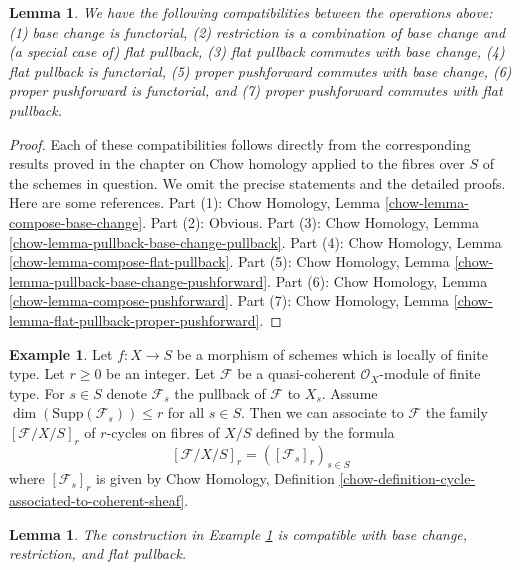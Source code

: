 \documentclass{stacks-project}
\theoremstyle{plain}
\newtheorem{lemma}[subsection]{Lemma}
\theoremstyle{definition}
\newtheorem{example}[subsection]{Example}
\theoremstyle{remark}
\numberwithin{equation}{subsection}
\begin{document}
\begin{lemma}
\label{lemma-compatibilities}
We have the following compatibilities between the operations above:
(1) base change is functorial,
(2) restriction is a combination of base change and (a special case of)
flat pullback,
(3) flat pullback commutes with base change,
(4) flat pullback is functorial,
(5) proper pushforward commutes with base change,
(6) proper pushforward is functorial, and
(7) proper pushforward commutes with flat pullback.
\end{lemma}

\begin{proof}
Each of these compatibilities follows directly from the corresponding
results proved in the chapter on Chow homology applied to the fibres
over $S$ of the schemes in question. We omit the precise statements and
the detailed proofs. Here are some references.
Part (1): Chow Homology, Lemma
\ref{chow-lemma-compose-base-change}.
Part (2): Obvious.
Part (3): Chow Homology, Lemma
\ref{chow-lemma-pullback-base-change-pullback}.
Part (4): Chow Homology, Lemma
\ref{chow-lemma-compose-flat-pullback}.
Part (5): Chow Homology, Lemma
\ref{chow-lemma-pullback-base-change-pushforward}.
Part (6): Chow Homology, Lemma
\ref{chow-lemma-compose-pushforward}.
Part (7): Chow Homology, Lemma
\ref{chow-lemma-flat-pullback-proper-pushforward}.
\end{proof}

\begin{example}
\label{example-family-associated-module}
Let $f : X \to S$ be a morphism of schemes which is locally of finite type.
Let $r \geq 0$ be an integer. Let $\mathcal{F}$ be a quasi-coherent
$\mathcal{O}_X$-module of finite type. For $s \in S$ denote $\mathcal{F}_s$
the pullback of $\mathcal{F}$ to $X_s$.
Assume $\dim(\text{Supp}(\mathcal{F}_s)) \leq r$ for all $s \in S$.
Then we can associate to $\mathcal{F}$ the family $[\mathcal{F}/X/S]_r$ of
$r$-cycles on fibres of $X/S$ defined by the formula
$$
[\mathcal{F}/X/S]_r = ([\mathcal{F}_s]_r)_{s \in S}
$$
where $[\mathcal{F}_s]_r$ is given by Chow Homology, Definition
\ref{chow-definition-cycle-associated-to-coherent-sheaf}.
\end{example}

\begin{lemma}
\label{lemma-family-associated-module}
The construction in Example \ref{example-family-associated-module}
is compatible with base change, restriction, and flat pullback.
\end{lemma}
\end{document}

